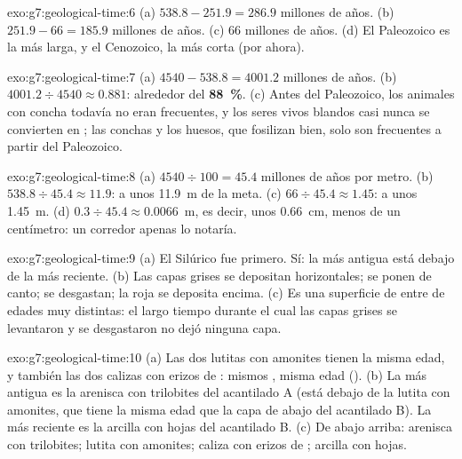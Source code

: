 \begin{solution}{exo:g7:geological-time:6}
(a) $538.8 - 251.9 = 286.9$ millones de años. (b) $251.9 - 66 = 185.9$
millones de años. (c) 66 millones de años. (d) El Paleozoico es la más
larga, y el Cenozoico, la más corta (por ahora).
\end{solution}

\begin{solution}{exo:g7:geological-time:7}
(a) $4540 - 538.8 = 4001.2$ millones de años. (b) $4001.2 \div 4540
\approx 0.881$: alrededor del \textbf{88~\%}. (c) Antes del Paleozoico, los
animales con concha todavía no eran frecuentes, y los seres vivos blandos
casi nunca se convierten en ; las conchas y los huesos, que
fosilizan bien, solo son frecuentes a partir del Paleozoico.
\end{solution}

\begin{solution}{exo:g7:geological-time:8}
(a) $4540 \div 100 = 45.4$ millones de años por metro. (b) $538.8 \div 45.4
\approx 11.9$: a unos \qty{11.9}{m} de la meta. (c) $66 \div
45.4 \approx 1.45$: a unos \qty{1.45}{m}. (d) $0.3 \div 45.4 \approx
0.0066$~m, es decir, unos \qty{0.66}{cm}, menos de un centímetro: un
corredor apenas lo notaría.
\end{solution}

\begin{solution}{exo:g7:geological-time:9}
(a) El Silúrico fue primero. Sí: la  más antigua está debajo de la más
reciente. (b) Las capas grises se depositan horizontales; se ponen de
canto; se desgastan; la  roja se deposita encima. (c) Es una
superficie de  entre  de edades muy distintas: el largo tiempo
durante el cual las capas grises se levantaron y se desgastaron no dejó
ninguna capa.
\end{solution}

\begin{solution}{exo:g7:geological-time:10}
(a) Las dos lutitas con amonites tienen la misma edad, y también las dos
calizas con erizos de : mismos , misma edad (). (b) La más antigua es la arenisca con trilobites del
acantilado A (está debajo de la lutita con amonites, que tiene la misma
edad que la capa de abajo del acantilado B). La más reciente es la arcilla
con hojas del acantilado B. (c) De abajo arriba: arenisca con trilobites;
lutita con amonites; caliza con erizos de ; arcilla con hojas.
\end{solution}

